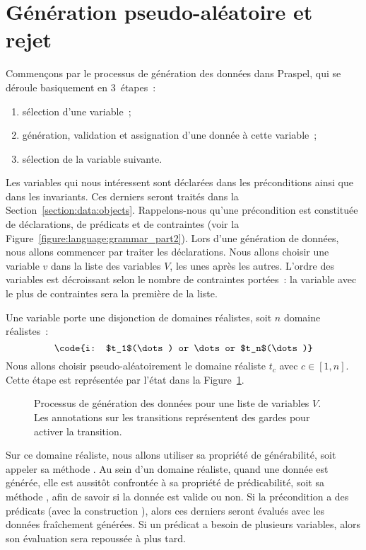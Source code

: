 \section{Génération pseudo-aléatoire et rejet}
\label{section:data:random}

Commençons par le processus de génération des données dans Praspel, qui se
déroule basiquement en 3~étapes~:

\begin{enumerate}

\item sélection d'une variable~;

\item génération, validation et assignation d'une donnée à cette variable~;

\item sélection de la variable suivante.

\end{enumerate}

Les variables qui nous intéressent sont déclarées dans les préconditions ainsi
que dans les invariants. Ces derniers seront traités dans la
Section~\ref{section:data:objects}. Rappelons-nous qu'une précondition est
constituée de déclarations, de prédicats et de contraintes (voir la
Figure~\ref{figure:language:grammar_part2}). Lors d'une génération de données,
nous allons commencer par traiter les déclarations. Nous allons choisir une
variable $v$ dans la liste des variables $V$, les unes après les autres.
L'ordre des variables est décroissant selon le nombre de contraintes portées~:
la variable avec le plus de contraintes sera la première de la liste.

Une variable porte une disjonction de domaines réalistes, soit $n$ domaine
réalistes~:
%
$$\code{i: $t_1$(\dots) or \dots or $t_n$(\dots)}$$
%
Nous allons choisir pseudo-aléatoirement le domaine réaliste $t_c$ avec $c \in
[1, n]$. Cette étape est représentée par l'état  dans la
Figure~\ref{figure:data:process}.
%
\begin{figure}


\caption{\label{figure:data:process} Processus de génération des données pour
une liste de variables $V$. Les annotations sur les transitions représentent des
gardes pour activer la transition.}

\end{figure}
%
Sur ce domaine réaliste, nous allons utiliser sa propriété de générabilité, soit
appeler sa méthode . Au sein d'un domaine réaliste, quand une
donnée est générée, elle est aussitôt confrontée à sa propriété de
prédicabilité, soit sa méthode , afin de savoir si la donnée est
valide ou non. Si la précondition a des prédicats (avec la construction
), alors ces derniers seront évalués avec les données fraîchement
générées. Si un prédicat a besoin de plusieurs variables, alors son évaluation
sera repoussée à plus tard.


